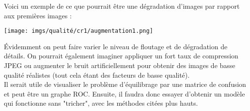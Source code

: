 \documentclass{article}
\begin{document}
Voici un exemple de ce que pourrait être une dégradation d'images par rapport aux premières images :

\begin{center}
\texttt{[image: imgs/qualité/cr1/augmentation1.png]}
\end{center}

Évidemment on peut faire varier le niveau de floutage et de dégradation de détails. On pourrait également imaginer appliquer un fort taux de compression JPEG ou augmenter le bruit artificiellement pour obtenir des images de basse qualité réalistes (tout cela étant des facteurs de basse qualité).\\

Il serait utile de visualiser le problème d'équilibrage par une matrice de confusion et peut être un graphe ROC. Ensuite, il faudra donc essayer d'obtenir un modèle qui fonctionne sans "tricher", avec les méthodes citées plus hauts.
\end{document}
